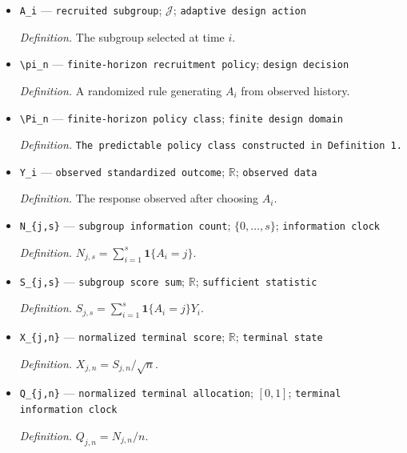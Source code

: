 \documentclass{article}
\begin{document}
\begin{itemize}
  \par\smallskip\noindent\emph{Definition.} The sigma-field generated by recruitment randomization and observed subgroup-outcome pairs through time \(i\).
  \item \texttt{A\_\allowbreak{}i} --- \texttt{recruited subgroup}; \(\mathcal J\); \texttt{adaptive design action}
  \par\smallskip\noindent\emph{Definition.} The subgroup selected at time \(i\).
  \item \texttt{\textbackslash{}\allowbreak{}pi\_\allowbreak{}n} --- \texttt{finite-\allowbreak{}horizon recruitment policy}; \texttt{design decision}
  \par\smallskip\noindent\emph{Definition.} A randomized rule generating \(A_i\) from observed history.
  \item \texttt{\textbackslash{}\allowbreak{}Pi\_\allowbreak{}n} --- \texttt{finite-\allowbreak{}horizon policy class}; \texttt{finite design domain}
  \par\smallskip\noindent\emph{Definition.} \texttt{The predictable policy class constructed in Definition 1.}
  \item \texttt{Y\_\allowbreak{}i} --- \texttt{observed standardized outcome}; \(\mathbb R\); \texttt{observed data}
  \par\smallskip\noindent\emph{Definition.} The response observed after choosing \(A_i\).
  \item \texttt{N\_\allowbreak{}\{j,\allowbreak{}s\}\allowbreak{}} --- \texttt{subgroup information count}; \(\{0,\ldots,s\}\); \texttt{information clock}
  \par\smallskip\noindent\emph{Definition.} \(N_{j,s}=\sum_{i=1}^s\mathbf 1\{A_i=j\}\).
  \item \texttt{S\_\allowbreak{}\{j,\allowbreak{}s\}\allowbreak{}} --- \texttt{subgroup score sum}; \(\mathbb R\); \texttt{sufficient statistic}
  \par\smallskip\noindent\emph{Definition.} \(S_{j,s}=\sum_{i=1}^s\mathbf 1\{A_i=j\}Y_i\).
  \item \texttt{X\_\allowbreak{}\{j,\allowbreak{}n\}\allowbreak{}} --- \texttt{normalized terminal score}; \(\mathbb R\); \texttt{terminal state}
  \par\smallskip\noindent\emph{Definition.} \(X_{j,n}=S_{j,n}/\sqrt n\).
  \item \texttt{Q\_\allowbreak{}\{j,\allowbreak{}n\}\allowbreak{}} --- \texttt{normalized terminal allocation}; \([0,1]\); \texttt{terminal information clock}
  \par\smallskip\noindent\emph{Definition.} \(Q_{j,n}=N_{j,n}/n\).

\end{itemize}
\end{document}
